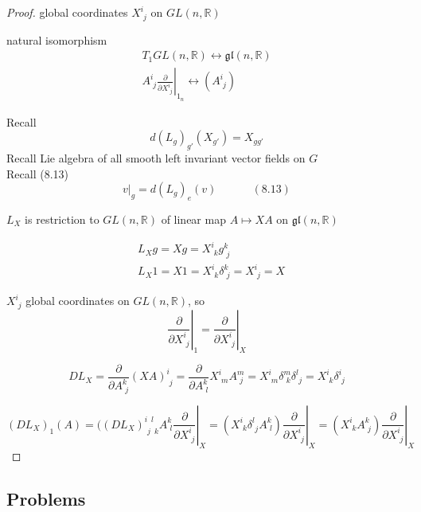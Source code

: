 \documentclass[11pt]{amsart}
\theoremstyle{definition}
\begin{document}
\begin{proof}
global coordinates $X^i_{ \, \, j}$ on $GL(n,\mathbb{R})$

natural isomorphism
\[
\begin{gathered}
  T_1GL(n,\mathbb{R}) \longleftrightarrow \mathfrak{gl}(n,\mathbb{R}) \\
  A^i_{ \, \, j } \left. \frac{ \partial }{ \partial X^i_{ \, \, j }} \right|_{1_n} \longleftrightarrow (A^i_{ \, \, j})
\end{gathered}
\]


Recall
\[
d(L_g)_{g'}(X_{g'}) = X_{gg'}
\]
Recall Lie algebra of all smooth left invariant vector fields on $G$ \\
Recall (8.13)
\begin{equation}
\left. v \right|_g = d(L_g)_e(v) \quad \quad \quad \, (8.13)
\end{equation}

$L_X$ is restriction to $GL(n,\mathbb{R})$ of linear map $A \mapsto XA$ on $\mathfrak{gl}{(n,\mathbb{R})}$

\[
\begin{aligned}
  & L_X g = Xg = X^i_{ \, \, k } g^k_{ \, \, j } \\
  & L_X 1 = X1 = X^i_{ \, \, k } \delta^k_{ \, \, j } = X^i_{ \, \, j } = X
\end{aligned}
\]

$X^i_{ \, \, j}$ global coordinates on $GL(n,\mathbb{R})$, so
\[
\left. \frac{ \partial }{ \partial X^i_{\, \, j}} \right|_1 = \left. \frac{ \partial }{ \partial X^i_{\, \, j}} \right|_X
\]

\[
DL_X = \frac{ \partial}{ \partial A^k_{ \, \, j} } ( XA)^i_{ \, \, j} = \frac{ \partial }{ \partial A^k_{ \, \, l} } X^i_{ \, \, m} A^m_{ \, \, j} = X^i_{ \, \, m} \delta^m_{ \, \, k } \delta^l_{ \, \, j } = X^i_{ \, \, k } \delta^i_{ \, \, j}
\]

\[
(DL_X)_1(A) = ((DL_X)^{i \, \, \, l }_{ \, \, j \, \, \, k } A^k_{\, \, l} \left. \frac{ \partial }{ \partial X^i_{ \, \, j } } \right|_X = ( X^i_{ \, \, k } \delta^l_{ \, \, j} A^k_{ \, \, l } ) \left. \frac{ \partial }{ \partial X^i_{ \, \, j } }\right|_X = (X^i_{ \, \, k} A^k_{ \, \, j} ) \left. \frac{ \partial }{ \partial X^i_{ \, \, j} } \right|_X
\]


\end{proof}




\subsection*{Problems}
\end{document}
